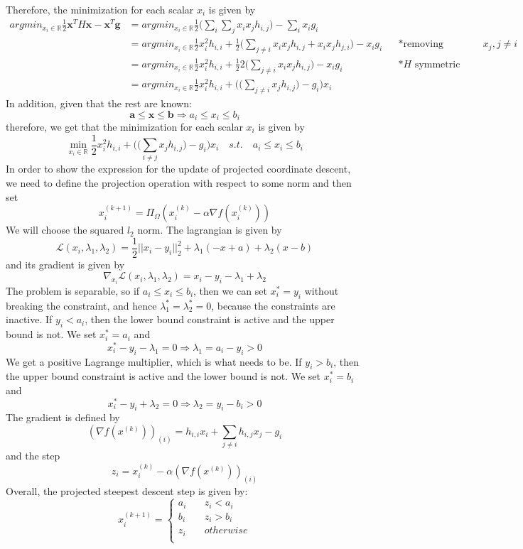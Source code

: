 \documentclass{article}
\begin{document}
\begin{enumerate}[(a)]
Therefore, the minimization for each scalar $x_i$ is given by
\begin{align*}
argmin_{x_i\in \mathbb{R}}\frac{1}{2}\mathbf{x}^TH \mathbf{x}-\mathbf{x}^T\mathbf{g} 
&= argmin_{x_i\in \mathbb{R}}\frac{1}{2}\Big(\sum_i\sum_jx_ix_jh_{i,j}\Big)-\sum_ix_ig_i\\
&= argmin_{x_i\in \mathbb{R}}\frac{1}{2}x_i^2h_{i,i}+\frac{1}{2}\Big(\sum_{j\ne i}x_ix_jh_{i,j}+x_ix_jh_{j,i}\Big)-x_ig_i &&*\text{removing consants-$x_j, j\ne i$}\\
&= argmin_{x_i\in \mathbb{R}}\frac{1}{2}x_i^2h_{i,i}+\frac{1}{2}2\Big(\sum_{j\ne i}x_ix_jh_{i,j}\Big)-x_ig_i &&*\text{$H$ symmetric}\\
&= argmin_{x_i\in \mathbb{R}}\frac{1}{2}x_i^2h_{i,i}+\Big(\Big(\sum_{j\ne i}x_jh_{i,j}\Big)-g_i\Big)x_i
\end{align*}
In addition, given that the rest are known:
\[\mathbf{a}\le \mathbf{x}\le \mathbf{b} \Rightarrow a_i \le x_i \le b_i\]
therefore, we get  that the minimization for each scalar $x_i$ is given by
\[\min_{x_i\in \mathbb{R}}\frac{1}{2}x_i^2h_{i,i}+\Big(\Big(\sum_{i\ne j}x_jh_{i,j}\Big)-g_i\Big)x_i \quad s.t. \quad a_i \le x_i \le b_i\]
In order to show the expression for the update of projected coordinate descent, we need to define the projection operation with respect to some norm and then set
\[x_i^{(k+1)} = \Pi_\Omega (x_i^{(k)} -\alpha \nabla f(x_i^{(k)})) \]
We will choose the squared $l_2$ norm. The lagrangian is given by
\[\mathcal{L}(x_i, \lambda_1, \lambda_2) = \frac{1}{2}||x_i-y_i||_2^2+\lambda_1(-x+a)+\lambda_2(x-b)       \]
and its gradient is given by
\[  \nabla_{x_i} \mathcal{L}(x_i, \lambda_1, \lambda_2) = x_i-y_i -\lambda_1+\lambda_2     \]
The problem is separable, so if $a_i \le x_i \le b_i$, then we can set $x_i^* = y_i$ without breaking the constraint, and hence $\lambda_1^*=\lambda_2^*=0$, because the
constraints are inactive. If $y_i < a_i$, then the lower bound constraint is active and the upper bound is not. We set $x_i^* = a_i$ and
\[x_i^* - y_i-\lambda_1 = 0 \Rightarrow\lambda_1 = a_i-y_i > 0 \]
We get a positive Lagrange multiplier, which is what needs to be. If $y_i>b_i$, then the upper bound constraint is active and the lower bound is not. We set $x_i^* = b_i$ and
\[x_i^* - y_i+\lambda_2 = 0 \Rightarrow\lambda_2 = y_i-b_i > 0 \]
The gradient is defined by
\[(\nabla f (x^{(k)}))_{(i)} = h_{i,i}x_i+\sum_{j\ne i}  h_{i,j}x_j -g_i   \]
and the step
\[z_i =  x_i^{(k)}-\alpha (\nabla f (x^{(k)}))_{(i)}   \]
Overall, the projected steepest descent step is given by:
\[x_i^{(k+1)} = 
\begin{cases}
a_i &\quad z_i <a_i\\
b_i &\quad z_i >b_i\\
z_i &\quad otherwise\\
\end{cases}
\]


\end{enumerate}
\end{document}

